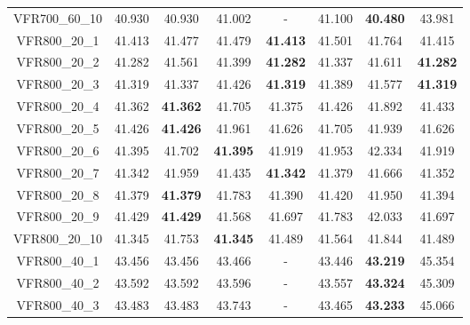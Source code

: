 \begin{tabular}{cc|ccc|ccc}
VFR700\_60\_10     & 40.930           & 40.930           & 41.002           & -                & 41.100           & {\bf 40.480}     & 43.981          \\ 
VFR800\_20\_1      & 41.413           & 41.477           & 41.479           & {\bf 41.413}     & 41.501           & 41.764           & 41.415          \\ 
VFR800\_20\_2      & 41.282           & 41.561           & 41.399           & {\bf 41.282}     & 41.337           & 41.611           & {\bf 41.282}    \\ 
VFR800\_20\_3      & 41.319           & 41.337           & 41.426           & {\bf 41.319}     & 41.389           & 41.577           & {\bf 41.319}    \\ 
VFR800\_20\_4      & 41.362           & {\bf 41.362}     & 41.705           & 41.375           & 41.426           & 41.892           & 41.433          \\ 
VFR800\_20\_5      & 41.426           & {\bf 41.426}     & 41.961           & 41.626           & 41.705           & 41.939           & 41.626          \\ 
VFR800\_20\_6      & 41.395           & 41.702           & {\bf 41.395}     & 41.919           & 41.953           & 42.334           & 41.919          \\ 
VFR800\_20\_7      & 41.342           & 41.959           & 41.435           & {\bf 41.342}     & 41.379           & 41.666           & 41.352          \\ 
VFR800\_20\_8      & 41.379           & {\bf 41.379}     & 41.783           & 41.390           & 41.420           & 41.950           & 41.394          \\ 
VFR800\_20\_9      & 41.429           & {\bf 41.429}     & 41.568           & 41.697           & 41.783           & 42.033           & 41.697          \\ 
VFR800\_20\_10     & 41.345           & 41.753           & {\bf 41.345}     & 41.489           & 41.564           & 41.844           & 41.489          \\ 
VFR800\_40\_1      & 43.456           & 43.456           & 43.466           & -                & 43.446           & {\bf 43.219}     & 45.354          \\ 
VFR800\_40\_2      & 43.592           & 43.592           & 43.596           & -                & 43.557           & {\bf 43.324}     & 45.309          \\ 
VFR800\_40\_3      & 43.483           & 43.483           & 43.743           & -                & 43.465           & {\bf 43.233}     & 45.066          \\ 

\end{tabular}
